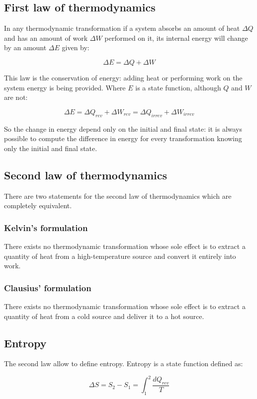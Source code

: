 	\subsection{First law of thermodynamics}
	In any thermodynamic transformation if a system absorbs an amount of heat $\Delta Q$ and has an amount of work $\Delta W$ performed on it, its internal energy will change by an amount $\Delta E$ given by:

	$$\Delta E = \Delta Q + \Delta W$$

	This law is the conservation of energy: adding heat or performing work on the system energy is being provided.
	Where $E$ is a state function, although $Q$ and $W$ are not:

	$$\Delta E = \Delta Q_{rev} + \Delta W_{rev} = \Delta Q_{irrev} + \Delta W_{irrev}$$

	So the change in energy depend only on the initial and final state: it is always possible to compute the difference in energy for every transformation knowing only the initial and final state.

	\subsection{Second law of thermodynamics}
	There are two statements for the second law of thermodynamics which are completely equivalent.

		\subsubsection{Kelvin's formulation}
		There exists no thermodynamic transformation whose sole effect is to extract a quantity of heat from a high-temperature source and convert it entirely into work.

		\subsubsection{Clausius' formulation}
		There exists no thermodynamic transformation whose sole effect is to extract a quantity of heat from a cold source and deliver it to a hot source.

	\subsection{Entropy}
	The second law allow to define entropy.
	Entropy is a state function defined as:

	$$\Delta S = S_2-S_1 = \int_1^2\frac{dQ_{rev}}{T}$$

